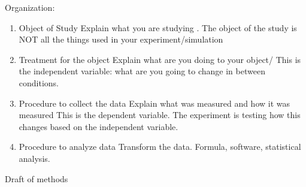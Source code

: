 \documentclass[a4paper]{article}
\begin{document}
Organization:

\begin{enumerate}
    \item Object of Study 
        \subitem Explain what you are studying . The object of the study is NOT
        all the things used in your experiment/simulation 
    \item Treatment for the object 
        \subitem Explain what are you doing to your object/
        This is the independent variable: what are you going to change in between
        conditions.
    \item Procedure to collect the data 
        \subitem Explain what was measured and how it was measured 
        This is the dependent variable. The experiment is testing how this 
        changes based on the independent variable.
    \item Procedure to analyze data
        \subitem Transform the data.
        \subitem Formula, software, statistical analysis.  
\end{enumerate}

Draft of methods 
\end{document}
